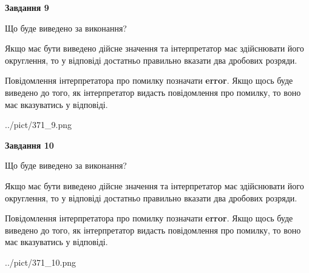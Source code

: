 \documentclass[12pt, ukrainian]{article}
\begin{document}
{\begin {Large}
{\begin {center}\textbf{Завдання 9}\end {center}}\par
Що буде виведено за виконання? \par

Якщо має бути виведено дійсне значення та інтерпретатор має здійснювати його округлення, 
то у відповіді достатньо правильно вказати два дробових розряди.

Повідомлення інтерпретатора про помилку позначати \textbf{error}.
Якщо щось буде виведено до того, як інтерпретатор видасть повідомлення про помилку, 
то воно має вказуватись у відповіді. \par

\begin{center}
	{../pict/371_9.png}
\end{center}
\newpage

{\begin {center}\textbf{Завдання 10}\end {center}}\par
Що буде виведено за виконання? \par

Якщо має бути виведено дійсне значення та інтерпретатор має здійснювати його округлення, 
то у відповіді достатньо правильно вказати два дробових розряди.

Повідомлення інтерпретатора про помилку позначати \textbf{error}.
Якщо щось буде виведено до того, як інтерпретатор видасть повідомлення про помилку, 
то воно має вказуватись у відповіді. \par

\begin{center}
	{../pict/371_10.png}
\end{center}
\newpage

\end {Large}}
\end{document}
